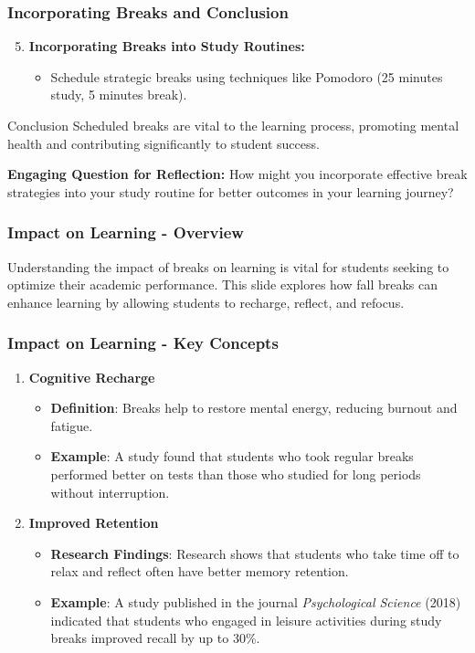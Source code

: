 \documentclass[aspectratio=169]{beamer}
\begin{document}
\begin{frame}[fragile]
    \frametitle{Incorporating Breaks and Conclusion}
    
    \begin{enumerate}
        \setcounter{enumi}{4} %
        \item \textbf{Incorporating Breaks into Study Routines:}
        \begin{itemize}
            \item Schedule strategic breaks using techniques like Pomodoro (25 minutes study, 5 minutes break).
        \end{itemize}
    \end{enumerate}

    \begin{block}{Conclusion}
        Scheduled breaks are vital to the learning process, promoting mental health and contributing significantly to student success.
    \end{block}

    \textbf{Engaging Question for Reflection:} How might you incorporate effective break strategies into your study routine for better outcomes in your learning journey?
\end{frame}

\begin{frame}[fragile]
    \frametitle{Impact on Learning - Overview}
    Understanding the impact of breaks on learning is vital for students seeking to optimize their academic performance. This slide explores how fall breaks can enhance learning by allowing students to recharge, reflect, and refocus.
\end{frame}

\begin{frame}[fragile]
    \frametitle{Impact on Learning - Key Concepts}
    \begin{enumerate}
        \item \textbf{Cognitive Recharge}
        \begin{itemize}
            \item \textbf{Definition}: Breaks help to restore mental energy, reducing burnout and fatigue.
            \item \textbf{Example}: A study found that students who took regular breaks performed better on tests than those who studied for long periods without interruption.
        \end{itemize}
        
        \item \textbf{Improved Retention}
        \begin{itemize}
            \item \textbf{Research Findings}: Research shows that students who take time off to relax and reflect often have better memory retention. 
            \item \textbf{Example}: A study published in the journal \textit{Psychological Science} (2018) indicated that students who engaged in leisure activities during study breaks improved recall by up to 30\%.
        \end{itemize}
    \end{enumerate}
\end{frame}
\end{document}
